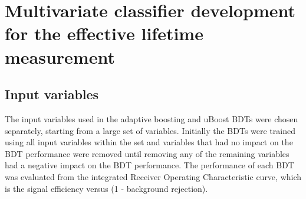 \chapter[Multivariate classifier development]{{\bf Multivariate classifier development for the \boldmath{\bsmumu} effective lifetime measurement}}
\label{sec:appendix2}


\section{Input variables}





The input variables used in the adaptive boosting and uBoost BDTs were chosen separately, starting from a large set of variables. %
Initially the BDTs were trained using all input variables within the set and variables that had no impact on the BDT performance were removed until removing any of the remaining variables had a negative impact on the BDT performance. The performance of each BDT was evaluated from the integrated Receiver Operating Characteristic curve, which is the signal efficiency versus (1 - background rejection). %


